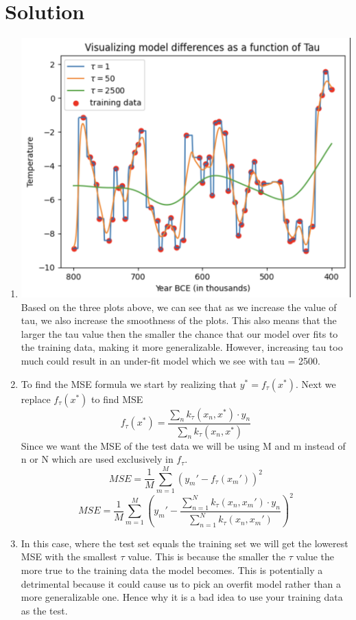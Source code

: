 \documentclass[submit]{harvardml}
\newenvironment{solution}
  {\color{blue}\section*{Solution}}
{}
\begin{document}
\begin{solution}
	\begin{enumerate}
	    \item \includegraphics[width=\textwidth]{q2.1.png}\\
        Based on the three plots above, we can see that as we increase the value of tau, we also increase the smoothness of the plots. This also means that the larger the tau value then the smaller the chance that our model over fits to the training data, making it more generalizable. However, increasing tau too much could result in an under-fit model which we see with tau = 2500.
        \item To find the MSE formula we start by realizing that $y^* = f_{\tau}(x^*)$. Next we replace $f_{\tau}(x^*)$ to find MSE
        $$ f_{\tau}(x^*) = \frac{\sum_{n}k_{\tau}(x_n, x^*)\cdot y_n}{\sum_{n}k_{\tau}(x_n, x^*)} $$
        Since we want the MSE of the test data we will be using M and m instead of n or N which are used exclusively in  $f_{\tau}$.
        $$ MSE = \frac{1}{M} \sum_{m=1}^M
        \left(y_m' - f_{\tau}(x_m')\right)^2$$
        $$ MSE = \frac{1}{M} \sum_{m=1}^M \left(y_m' - \frac{\sum_{n = 1}^N k_{\tau}(x_n, x_m')\cdot y_n}{\sum_{n = 1}^N k_{\tau}(x_n, x_m')} \right)^2 $$
        \item In this case, where the test set equals the training set we will get the lowerest MSE with the smallest $\tau$ value. This is because the smaller the $\tau$ value the more true to the training data the model becomes. This is potentially a detrimental because it could cause us to pick an overfit model rather than a more generalizable one. Hence why it is a bad idea to use your training data as the test.

\end{enumerate}
\end{solution}
\end{document}
